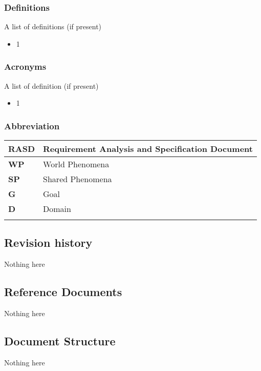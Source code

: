 \subsubsection*{Definitions}
A list of definitions (if present)
\begin{itemize}
    \item 1
\end{itemize}
\subsubsection*{Acronyms}
A list of definition (if present)
\begin{itemize}
    \item 1
\end{itemize}
\subsubsection*{Abbreviation}
\begin{table}[h]
    \begin{tabular}{|l|l|}
        \toprule
        \textbf{RASD} & Requirement Analysis and Specification Document \\ \midrule
        \textbf{WP}   & World Phenomena                                 \\ \midrule
        \textbf{SP}   & Shared Phenomena                                \\ \midrule
        \textbf{G}    & Goal                                            \\ \midrule
        \textbf{D}    & Domain                                          \\ \midrule
                      &                                                 \\ \bottomrule
    \end{tabular}
\end{table}
\subsection{Revision history}
Nothing here

\subsection{Reference Documents}
Nothing here

\subsection{Document Structure}
Nothing here
